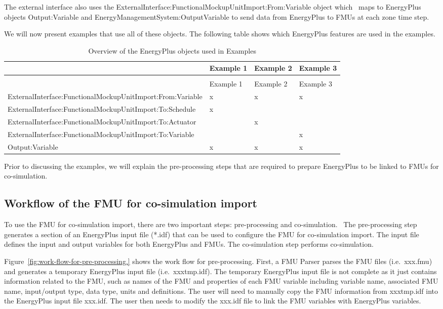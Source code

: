The external interface also uses the ExternalInterface:FunctionalMockupUnitImport:From:Variable object which~ maps to EnergyPlus objects Output:Variable and EnergyManagementSystem:OutputVariable to send data from EnergyPlus to FMUs at each zone time step.

We will now present examples that use all of these objects. The following table shows which EnergyPlus features are used in the examples.

\begin{longtable}[c]{p{1.5in}p{1.5in}p{1.5in}p{1.5in}}
\caption{Overview of the EnergyPlus objects used in Examples \label{table:overview-of-the-energyplus-objects-used-in-001}} \tabularnewline
\toprule
~ & Example 1 & Example 2 & Example 3 \tabularnewline
\midrule
\endfirsthead

\caption[]{Overview of the EnergyPlus objects used in Examples} \tabularnewline
\toprule
~ & Example 1 & Example 2 & Example 3 \tabularnewline
\midrule
\endhead

ExternalInterface:FunctionalMockupUnitImport:From:Variable & x & x & x \tabularnewline
ExternalInterface:FunctionalMockupUnitImport:To:Schedule & x & ~ & ~ \tabularnewline
ExternalInterface:FunctionalMockupUnitImport:To:Actuator & ~ & x & ~ \tabularnewline
ExternalInterface:FunctionalMockupUnitImport:To:Variable & ~ & ~ & x \tabularnewline
Output:Variable & x & x & x \tabularnewline
\bottomrule
\end{longtable}

Prior to discussing the examples, we will explain the pre-processing steps that are required to prepare EnergyPlus to be linked to FMUs for co-simulation.

\subsection{Workflow of the FMU for co-simulation import}\label{workflow-of-the-fmu-for-co-simulation-import}

To use the FMU for co-simulation import, there are two important steps: pre-processing and co-simulation.~ The pre-processing step generates a section of an EnergyPlus input file (*.idf) that can be used to configure the FMU for co-simulation import. The input file defines the input and output variables for both EnergyPlus and FMUs. The co-simulation step performs co-simulation.

Figure~\ref{fig:work-flow-for-pre-processing.} shows the work flow for pre-processing. First, a FMU Parser parses the FMU files (i.e.~xxx.fmu) and generates a temporary EnergyPlus input file (i.e.~xxxtmp.idf). The temporary EnergyPlus input file is not complete as it just contains information related to the FMU, such as names of the FMU and properties of each FMU variable including variable name, associated FMU name, input/output type, data type, units and definitions. The user will need to manually copy the FMU information from xxxtmp.idf into the EnergyPlus input file xxx.idf. The user then needs to modify the xxx.idf file to link the FMU variables with EnergyPlus variables.

